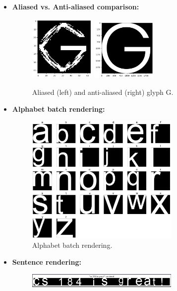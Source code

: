 \documentclass[11pt]{article}
\begin{document}
\begin{itemize}[leftmargin=*,nosep]
    \item \textbf{Aliased vs. Anti-aliased comparison:}
    \begin{figure}[h]
        \centering
        \includegraphics[width=0.3\textwidth]{../images/noAAForG.png}
        \includegraphics[width=0.3\textwidth]{../images/AAForG.jpg}
        \caption{Aliased (left) and anti-aliased (right) glyph G.}
    \end{figure}
    \item \textbf{Alphabet batch rendering:}
    \begin{figure}[h]
        \centering
        \includegraphics[width=0.7\textwidth]{../images/alphabet_grid.jpeg}
        \caption{Alphabet batch rendering.}
    \end{figure}
    \item \textbf{Sentence rendering:}
    \begin{figure}[h]
        \centering
        \includegraphics[width=0.7\textwidth]{../images/sentence_cs184.jpeg}

\end{figure}
\end{itemize}
\end{document}
